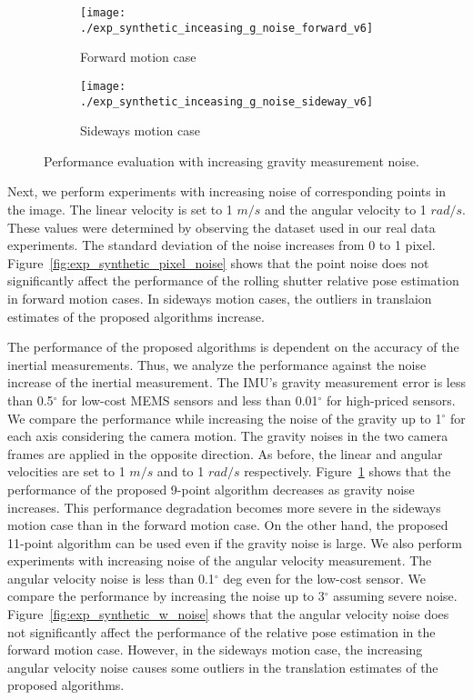 \documentclass[10pt,twocolumn,letterpaper]{article}
\theoremstyle{definition}
\begin{document}
	
	
	\begin{figure}[t]
		\begin{subfigure}[b]{0.99\linewidth}
			\texttt{[image: ./exp\_synthetic\_inceasing\_g\_noise\_forward\_v6]}
			\caption{Forward motion case}
		\end{subfigure}
		\begin{subfigure}[b]{0.99\linewidth}
			\texttt{[image: ./exp\_synthetic\_inceasing\_g\_noise\_sideway\_v6]}
			\caption{Sideways motion case}
		\end{subfigure}%
		\caption{Performance evaluation with increasing gravity measurement noise.}
		\label{fig:exp_synthetic_g_noise}
	\end{figure}  
	
	
	Next, we perform experiments with increasing noise of corresponding points in the image.
	The linear velocity is set to 1 $m/s$ and the angular velocity to 1 $rad/s$.
	These values were determined by observing the dataset used in our real data experiments.
	The standard deviation of the noise increases from 0 to 1 pixel.
	Figure~\ref{fig:exp_synthetic_pixel_noise} shows that the point noise does not significantly affect the performance of the rolling shutter relative pose estimation in forward motion cases.
	In sideways motion cases, the outliers in translaion estimates of the proposed algorithms increase. 
	
	
	The performance of the proposed algorithms is dependent on the accuracy of the inertial measurements.
	Thus, we analyze the performance against the noise increase of the inertial measurement.
	The IMU's gravity measurement error is less than 0.5$^{\circ}$ for low-cost MEMS sensors and less than 0.01$^{\circ}$ for high-priced sensors.
	We compare the performance while increasing the noise of the gravity up to 1$^{\circ}$ for each axis considering the camera motion.
	The gravity noises in the two camera frames are applied in the opposite direction.
	As before, the linear and angular velocities are set to 1 $m/s$ and to 1 $rad/s$ respectively.
	Figure~\ref{fig:exp_synthetic_g_noise} shows that the performance of the proposed 9-point algorithm decreases as gravity noise increases.
	This performance degradation becomes more severe in the sideways motion case than in the forward motion case.
	On the other hand, the proposed 11-point algorithm can be used even if the gravity noise is large.
	We also perform experiments with increasing noise of the angular velocity measurement.
	The angular velocity noise is less than 0.1$^{\circ}$ deg even for the low-cost sensor.
	We compare the performance by increasing the noise up to 3$^{\circ}$ assuming severe noise.
	Figure~\ref{fig:exp_synthetic_w_noise} shows that the angular velocity noise does not significantly affect the performance of the relative pose estimation in the forward motion case.
	However, in the sideways motion case, the increasing angular velocity noise causes some outliers in the translation estimates of the proposed algorithms.
	
\end{document}
